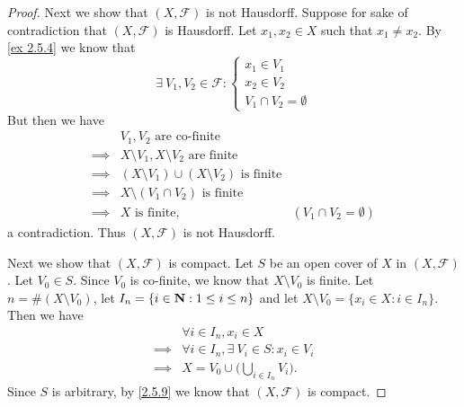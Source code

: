 \begin{proof}
  Next we show that \((X, \mathcal{F})\) is not Hausdorff.
  Suppose for sake of contradiction that \((X, \mathcal{F})\) is Hausdorff.
  Let \(x_1, x_2 \in X\) such that \(x_1 \neq x_2\).
  By \cref{ex 2.5.4} we know that
  \[
    \exists\ V_1, V_2 \in \mathcal{F} : \begin{cases}
      x_1 \in V_1 \\
      x_2 \in V_2 \\
      V_1 \cap V_2 = \emptyset
    \end{cases}
  \]
  But then we have
  \begin{align*}
             & V_1, V_2 \text{ are co-finite}                                                          \\
    \implies & X \setminus V_1, X \setminus V_2 \text{ are finite}                                     \\
    \implies & (X \setminus V_1) \cup (X \setminus V_2) \text{ is finite}                              \\
    \implies & X \setminus (V_1 \cap V_2) \text{ is finite}                                            \\
    \implies & X \text{ is finite},                                       & (V_1 \cap V_2 = \emptyset)
  \end{align*}
  a contradiction.
  Thus \((X, \mathcal{F})\) is not Hausdorff.

  Next we show that \((X, \mathcal{F})\) is compact.
  Let \(S\) be an open cover of \(X\) in \((X, \mathcal{F})\).
  Let \(V_0 \in S\).
  Since \(V_0\) is co-finite, we know that \(X \setminus V_0\) is finite.
  Let \(n = \#(X \setminus V_0)\), let \(I_n = \{i \in \mathbf{N} : 1 \leq i \leq n\}\) and let \(X \setminus V_0 = \{x_i \in X : i \in I_n\}\).
  Then we have
  \begin{align*}
             & \forall i \in I_n, x_i \in X                        \\
    \implies & \forall i \in I_n, \exists\ V_i \in S : x_i \in V_i \\
    \implies & X = V_0 \cup \bigg(\bigcup_{i \in I_n} V_i\bigg).
  \end{align*}
  Since \(S\) is arbitrary, by \cref{2.5.9} we know that \((X, \mathcal{F})\) is compact.


\end{proof}
